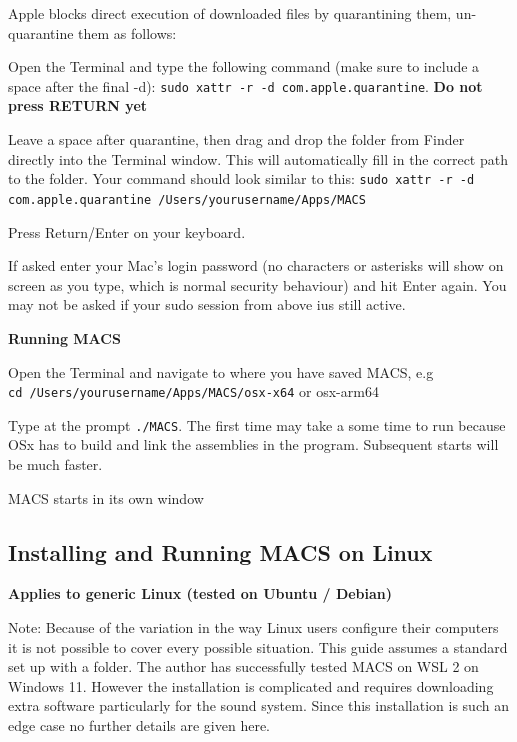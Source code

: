 Apple blocks direct execution of downloaded files by quarantining them, un-quarantine them as follows:

\begin{compactenum}
    \item Open the Terminal and type the following command (make sure to include a space after the final -d): \texttt{sudo xattr -r -d com.apple.quarantine}. \textbf{Do not press RETURN yet}
    \item Leave a space after quarantine, then drag and drop the folder from Finder directly into the Terminal window. This will automatically fill in the correct path to the folder. Your command should look similar to this: \texttt{sudo xattr -r -d com.apple.quarantine /Users/yourusername/Apps/MACS}
    \item Press Return/Enter on your keyboard.
    \item If asked enter your Mac's login password (no characters or asterisks will show on screen as you type, which is normal security behaviour) and hit Enter again. You may not be asked if your sudo session from above ius still active.
\end{compactenum}

\textbf{Running MACS}

\begin{compactenum}
    \item Open the Terminal and navigate to where you have saved MACS, e.g \\
    \texttt{cd /Users/yourusername/Apps/MACS/osx-x64} or osx-arm64
    \item Type at the prompt \texttt{./MACS}. The first time may take a some time to run because OSx has to build and link the assemblies in the program. Subsequent starts will be much faster.
    \item MACS starts in its own window
\end{compactenum}

\subsection{Installing and Running MACS on Linux}

\textbf{Applies to generic Linux (tested on Ubuntu / Debian)}

\begin{faintquote}
    Note: Because of the variation in the way Linux users configure their computers it is not possible to cover every possible situation. This guide assumes a standard set up with a  folder. The author has successfully tested MACS on WSL 2 on Windows 11. However the installation is complicated and requires downloading extra software particularly for the sound system. Since this installation is such an edge case no further details are given here.
\end{faintquote}


